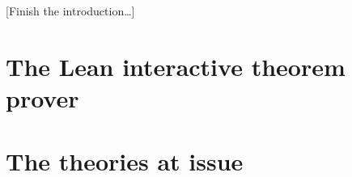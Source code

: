\documentclass{article}
\theoremstyle{definition}
\theoremstyle{remark}
\begin{document}
[Finish the introduction\dots]

\section{The Lean interactive theorem prover}
\label{s:lean}


\section{The theories at issue}
\label{s:theories}


\printbibliography
\end{document}
